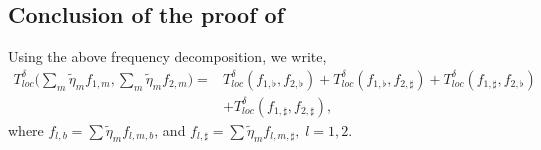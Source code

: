 \documentclass[a4paper,reqno]{amsart}
\theoremstyle{definition}
\theoremstyle{remark}
\numberwithin{equation}{section}
\begin{document}
	\subsection{Conclusion of the proof of }Using the above frequency decomposition, we write,
	\[
	\begin{aligned}
		T_{loc}^{\delta}\Big(\sum_m \tilde{\eta}_m f_{1, m}, \sum_m \tilde{\eta}_m f_{2, m}\Big)=& T_{loc}^{\delta}\left(f_{1, \flat}, f_{2, \flat}\right)+T_{loc}^{\delta}\left(f_{1, \flat}, f_{2, \sharp}\right) +T_{loc}^\delta\left(f_{1, \sharp}, f_{2, \flat}\right)\\
		&+T_{loc}^{\delta}\left(f_{1, \sharp}, f_{2, \sharp}\right),
	\end{aligned}
	\]
	where $f_{l,b}=\sum\tilde{\eta}_mf_{l,m,b}$, and $f_{l,\sharp}=\sum\tilde{\eta}_mf_{l,m,\sharp},\;l=1,2$.
	
\end{document}
